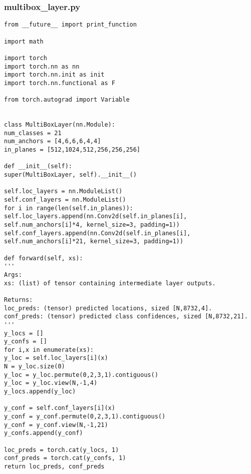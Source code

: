 \subsubsection*{multibox\_layer.py}
\begin{lstlisting}
from __future__ import print_function

import math

import torch
import torch.nn as nn
import torch.nn.init as init
import torch.nn.functional as F

from torch.autograd import Variable


class MultiBoxLayer(nn.Module):
num_classes = 21
num_anchors = [4,6,6,6,4,4]
in_planes = [512,1024,512,256,256,256]

def __init__(self):
super(MultiBoxLayer, self).__init__()

self.loc_layers = nn.ModuleList()
self.conf_layers = nn.ModuleList()
for i in range(len(self.in_planes)):
self.loc_layers.append(nn.Conv2d(self.in_planes[i], self.num_anchors[i]*4, kernel_size=3, padding=1))
self.conf_layers.append(nn.Conv2d(self.in_planes[i], self.num_anchors[i]*21, kernel_size=3, padding=1))

def forward(self, xs):
'''
Args:
xs: (list) of tensor containing intermediate layer outputs.

Returns:
loc_preds: (tensor) predicted locations, sized [N,8732,4].
conf_preds: (tensor) predicted class confidences, sized [N,8732,21].
'''
y_locs = []
y_confs = []
for i,x in enumerate(xs):
y_loc = self.loc_layers[i](x)
N = y_loc.size(0)
y_loc = y_loc.permute(0,2,3,1).contiguous()
y_loc = y_loc.view(N,-1,4)
y_locs.append(y_loc)

y_conf = self.conf_layers[i](x)
y_conf = y_conf.permute(0,2,3,1).contiguous()
y_conf = y_conf.view(N,-1,21)
y_confs.append(y_conf)

loc_preds = torch.cat(y_locs, 1)
conf_preds = torch.cat(y_confs, 1)
return loc_preds, conf_preds
\end{lstlisting}

